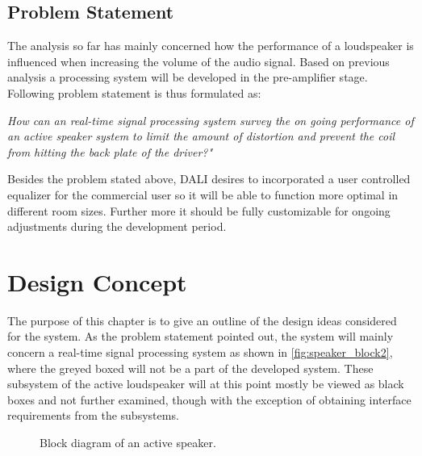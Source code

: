 %

%

%

\section{Problem Statement}
The analysis so far has mainly concerned how the performance of a loudspeaker is influenced when increasing the volume of the audio signal. Based on previous analysis a processing system will be developed in the pre-amplifier stage. Following problem statement is thus formulated as:

\begin{center}
\label{ProblemStatement}
\textit{How can an real-time signal processing system survey the on going performance of an active speaker system to limit the amount of distortion and prevent the coil from hitting the back plate of the driver?"}
\end{center}
Besides the problem stated above, DALI desires to incorporated a user controlled equalizer for the commercial user so it will be able to function more optimal in different room sizes. Further more it should be fully customizable for ongoing adjustments during the development period.


\chapter{Design Concept}
The purpose of this chapter is to give an outline of the design ideas considered for the system. As the problem statement pointed out, the system will mainly concern a real-time signal processing system as shown in \autoref{fig:speaker_block2}, where the greyed boxed will not be a part of the developed system. These subsystem of the active loudspeaker will at this point mostly be viewed as black boxes and not further examined, though with the exception of obtaining interface requirements from the subsystems.

\begin{figure}[H]
\centering
{}
\scalebox{0.9}{
}
\caption{Block diagram of an active speaker.}
\label{fig:speaker_block2}
\end{figure}

